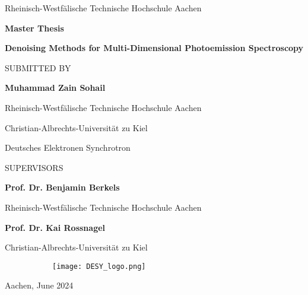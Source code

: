 \begin{titlepage}
    \begin{center}
        Rheinisch-Westfälische Technische Hochschule Aachen
        \vspace{0.2cm}
        
        \Large
        \textbf{Master Thesis}
            
        \vspace{0.5cm}
        \Large
        \textbf{Denoising Methods for Multi-Dimensional Photoemission Spectroscopy}
        
        \normalsize   
        \vspace{1cm}
        SUBMITTED BY
        \vspace{0.3cm} 
        
        \large
        \textbf{Muhammad Zain Sohail}
        
        \normalsize
        Rheinisch-Westfälische Technische Hochschule Aachen
        
        Christian-Albrechts-Universität zu Kiel
        
        Deutsches Elektronen Synchrotron
        
        \normalsize
        \vspace{1cm}         
        SUPERVISORS
        
        \large
        \vspace{0.3cm}

        \textbf{Prof. Dr. Benjamin Berkels }
        
        \normalsize
        Rheinisch-Westfälische Technische Hochschule Aachen
        
        
        \vspace{0.3cm}
        \large 
        \textbf{Prof. Dr. Kai Rossnagel}
        
        \normalsize
        Christian-Albrechts-Universität zu Kiel
            
        \vfill
            
        \begin{figure}[h]
            \begin{subfigure}{0.25\textwidth}
                \texttt{[image: DESY\_logo.png]}
            \end{subfigure}
        \end{figure}
        
        \vspace{0.5cm}
        Aachen, June 2024
            
    \end{center}
\end{titlepage}